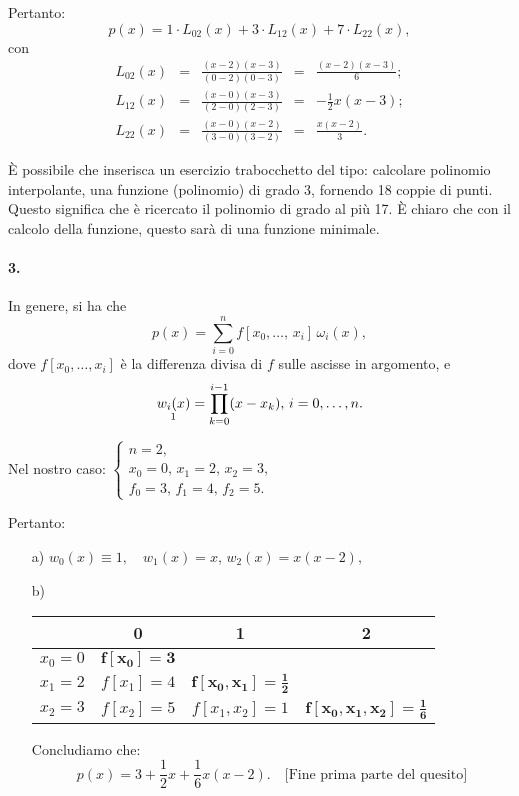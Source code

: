 \noindent Pertanto:
\begin{equation*}
    p(x) = 1\cdot L_{02}(x)+3\cdot L_{12}(x) + 7\cdot L_{22}(x),
\end{equation*}
con
\begin{equation*}
    \begin{matrix}
        L_{02}(x) &=& \frac{(x-2)(x-3)}{(0-2)(0-3)} &=& \frac{(x-2)(x-3)}{6};\\
        L_{12}(x) &=& \frac{(x-0)(x-3)}{(2-0)(2-3)} &=& -\frac{1}{2}x(x-3);\\
        L_{22}(x) &=& \frac{(x-0)(x-2)}{(3-0)(3-2)} &=& \frac{x(x-2)}{3}.
    \end{matrix}
\end{equation*}

\noindent È possibile che inserisca un esercizio trabocchetto del tipo: calcolare polinomio interpolante, una funzione (polinomio) di grado 3, fornendo 18 coppie di punti. Questo significa che è ricercato il polinomio di grado al più 17. È chiaro che con il calcolo della funzione, questo sarà di una funzione minimale.

\paragraph{3.} In genere, si ha che
\begin{equation*}
    p(x) = \sum_{i=0}^n f[x_0,\hdots,\, x_i]\,\omega_i(x),
\end{equation*}
dove $f[x_0,\hdots, x_i]$ è la differenza divisa di $f$ sulle ascisse in argomento, e
\begin{equation*}
    \underset{\footnotemark}{w_i(x)}=\prod_{k=0}^{i-1}(x-x_k),\, i=0,\hdots, n.
\end{equation*}

\noindent Nel nostro caso:
$\begin{cases}
    n=2,\\
    x_0=0,\, x_1=2,\, x_2 = 3,\\
    f_0 = 3,\, f_1=4,\, f_2=5.
\end{cases}$

\noindent Pertanto:
\begin{itemize}
    \item[a)] $w_0(x)\equiv 1,\quad w_1(x)=x,\, w_2(x)=x(x-2),$
    \item[b)]
    \begin{tabular}{c|ccc}
         & 0 & 1 & 2 \\
         \hline
        $x_0=0$ & $\boldsymbol{f[x_0]=3}$\\
        $x_1=2$ & $f[x_1]=4$ & $\boldsymbol{f[x_0, x_1]=\frac{1}{2}}$\\
        $x_2=3$ & $f[x_2]=5$ & $f[x_1, x_2]=1$ & $\boldsymbol{f[x_0, x_1, x_2]=\frac{1}{6}}$
    \end{tabular}
    
    \noindent Concludiamo che:
    \begin{equation*}
        p(x)=3+\frac{1}{2}x+\frac{1}{6}x(x-2).\quad \text{[Fine prima parte del quesito]}
    \end{equation*}
\end{itemize}

